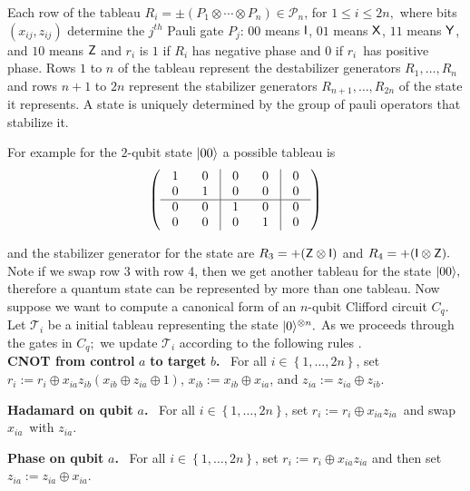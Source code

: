 Each row  of the tableau $R_{i}=\pm (P_{1}\otimes \cdots \otimes P_{n})\in \mathcal{P}_n$, for $1\leq i\leq 2n,$ where bits $(x_{ij},z_{ij})$ determine the $j^{th}$ Pauli gate $P_{j}$: $00$
means ${\sf I}$, $01$ means ${\sf X}$, $11$ means ${\sf Y}$, and $10$ means ${\sf Z}$ and $r_{i}$ is $1$ if $R_{i}$ has negative phase and $0$ if $r_{i}$\ has
positive phase. Rows $1$ to $n$ of the tableau represent the destabilizer generators $R_{1},\ldots,R_{n}$ and rows $n+1$ to $2n$ represent the stabilizer
generators $R_{n+1},\ldots,R_{2n}$ of the state it represents. A state is uniquely determined by the group of pauli operators that stabilize it.

For example for the $2$-qubit state ${\lvert}00\rangle$ a possible tableau is
\[
\left(
\begin{tabular}
[c]{cc|cc|c}%
$~1~$ & $~0~$ & $~0~$ & $~0~$ & $~0~$\\
$~0~$ & $~1~$ & $~0~$ & $~0~$ & $~0~$\\\hline
$~0~$ & $~0~$ & $~1~$ & $~0~$ & $~0~$\\
$~0~$ & $~0~$ & $~0~$ & $~1~$ & $~0~$%
\end{tabular}
\right)
\]

and the stabilizer generator for the state are $R_3=+({\sf Z} \otimes {\sf I})$ and $R_4=+({\sf I}\otimes {\sf Z}).$ Note if we swap row 3 with row 4, then we get another tableau for the state ${\lvert}00\rangle,$ therefore a quantum state can be represented by more than one tableau. Now suppose we want to compute a canonical form of an $n$-qubit Clifford circuit $C_q.$ Let $\mathcal{T}_i$ be a initial tableau representing the state ${\lvert}0\rangle^{\otimes n}.$ As we proceeds through the gates in $C_q;$ we update $\mathcal{T}_i$  according to the following rules \cite{AG04}.\\


\noindent\textbf{CNOT from control }$a$\textbf{ to target }$b$\textbf{.} \ For
all $i\in\left\{  1,\ldots,2n\right\}  $, set $r_{i}:=r_{i}\oplus x_{ia}%
z_{ib}\left(  x_{ib}\oplus z_{ia}\oplus1\right)  $, $x_{ib}:=x_{ib}\oplus
x_{ia}$, and $z_{ia}:=z_{ia}\oplus z_{ib}$.\medskip

\noindent\textbf{Hadamard on qubit }$a$\textbf{.} \ For all $i\in\left\{
1,\ldots,2n\right\}  $, set $r_{i}:=r_{i}\oplus x_{ia}z_{ia}$\ and swap
$x_{ia}$\ with $z_{ia}$.\medskip

\noindent\textbf{Phase on qubit }$a$\textbf{.} \ For all $i\in\left\{
1,\ldots,2n\right\}  $, set $r_{i}:=r_{i}\oplus x_{ia}z_{ia}$ and then set
$z_{ia}:=z_{ia}\oplus x_{ia}$.\medskip



